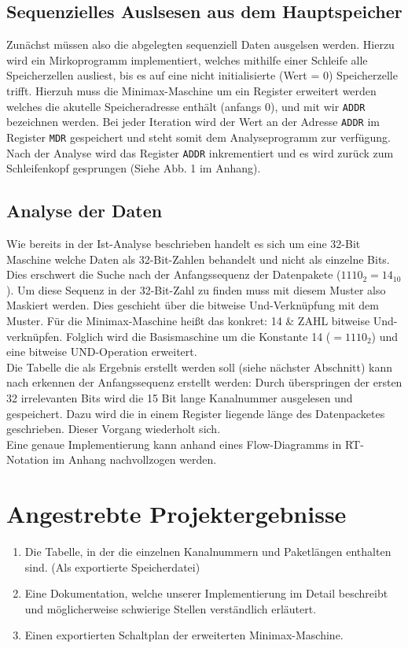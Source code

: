 \documentclass[12pt,titlepage]{article}
\begin{document}
\subsection{Sequenzielles Auslsesen aus dem Hauptspeicher}
Zun{\"a}chst m{\"u}ssen also die abgelegten sequenziell Daten ausgelsen werden. Hierzu wird ein Mirkoprogramm implementiert, welches mithilfe
einer Schleife alle Speicherzellen ausliest, bis es auf eine nicht initialisierte (Wert = 0) Speicherzelle trifft. 
Hierzuh muss die Minimax-Maschine um ein Register erweitert werden welches die akutelle Speicheradresse enth{\"a}lt (anfangs 0),
und mit wir \texttt{ADDR} bezeichnen werden. Bei jeder Iteration wird der Wert an der Adresse \texttt{ADDR} im Register 
\texttt{MDR} gespeichert und steht somit dem Analyseprogramm zur verf{\"u}gung. Nach der Analyse wird das Register \texttt{ADDR}
inkrementiert und es wird zur{\"u}ck zum Schleifenkopf gesprungen (Siehe Abb. 1 im Anhang).

\subsection{Analyse der Daten}


Wie bereits in der Ist-Analyse beschrieben handelt es sich um eine 32-Bit Maschine welche Daten als 32-Bit-Zahlen behandelt und nicht als 
einzelne Bits. Dies erschwert die Suche nach der Anfangssequenz der Datenpakete ($1110_{2} = 14_{10}$). Um diese Sequenz in der 32-Bit-Zahl
zu finden muss mit diesem Muster also Maskiert werden. Dies geschieht über die bitweise Und-Verknüpfung mit dem Muster. Für die Minimax-Maschine
heißt das konkret: 14 \& ZAHL bitweise Und-verkn{\"u}pfen. Folglich wird die Basismaschine um die Konstante 14 ($=1110_{2}$) und eine bitweise UND-Operation
erweitert.\\
Die Tabelle die als Ergebnis erstellt werden soll (siehe n{\"a}chster Abschnitt) kann nach erkennen der Anfangssequenz erstellt werden:
Durch überspringen der ersten 32 irrelevanten Bits wird die 15 Bit lange Kanalnummer ausgelesen und gespeichert. Dazu wird die in einem Register liegende l{\"a}nge des Datenpacketes geschrieben. Dieser Vorgang wiederholt sich.\\
Eine genaue Implementierung kann anhand eines Flow-Diagramms in RT-Notation im Anhang nachvollzogen werden.


\section{Angestrebte Projektergebnisse}
\begin{enumerate}
\item Die Tabelle, in der die einzelnen Kanalnummern und Paketl{\"a}ngen enthalten sind. (Als exportierte Speicherdatei)
\item Eine Dokumentation, welche unserer Implementierung im Detail beschreibt und m{\"o}glicherweise schwierige Stellen verst{\"a}ndlich erl{\"a}utert.
\item Einen exportierten Schaltplan der erweiterten Minimax-Maschine.
\end{enumerate}
\end{document}
